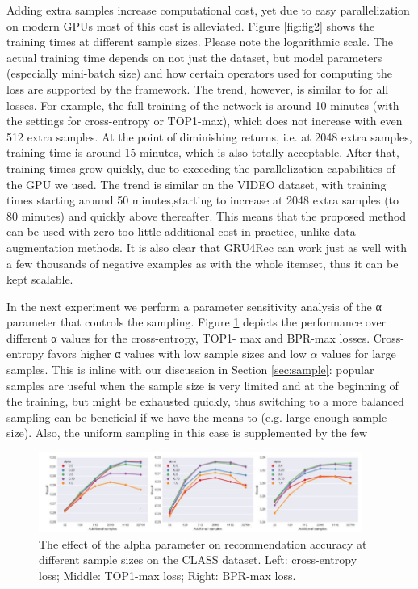 Adding extra samples increase computational cost, yet due to easy parallelization on modern GPUs most of this cost is alleviated. Figure \ref{fig:fig2} shows the training times at different sample sizes. Please note the logarithmic scale. The actual training time depends on not just the dataset, but model parameters (especially mini-batch size) and how certain operators used for computing the loss are supported by the framework. The trend, however, is similar to for all losses. For example, the full training of the network is around 10 minutes (with the settings for cross-entropy or TOP1-max), which does not increase with even 512 extra samples. At the point of diminishing returns, i.e. at 2048 extra samples, training time is around 15 minutes, which is also totally acceptable. After that, training times grow quickly, due to exceeding the parallelization capabilities of the GPU we used. The trend is similar on the VIDEO dataset, with training times starting around 50 minutes,starting to increase at 2048 extra samples (to 80 minutes) and quickly above thereafter. This means that the proposed method can be used with zero too little additional cost in practice, unlike data augmentation methods. It is also clear that GRU4Rec can work just as well with a few thousands of negative examples as with the whole itemset, thus it can be kept scalable.

In the next experiment we perform a parameter sensitivity analysis of the α parameter that controls the sampling. Figure \ref{fig:fig4} depicts the performance over different α values for the cross-entropy, TOP1- max and BPR-max losses. Cross-entropy favors higher α values with low sample sizes and low $\alpha$
values for large samples. This is inline with our discussion in Section \ref{sec:sample}: popular samples are useful
when the sample size is very limited and at the beginning of the training, but might be exhausted
quickly, thus switching to a more balanced sampling can be beneficial if we have the means to (e.g.
large enough sample size). Also, the uniform sampling in this case is supplemented by the few


\begin{figure}[htp]
    \centering
    \includegraphics[width=400]{img/p4.JPG}
    \caption{The effect of the alpha parameter on recommendation accuracy at different sample sizes
on the CLASS dataset. Left: cross-entropy loss; Middle: TOP1-max loss; Right: BPR-max loss.}
    \label{fig:fig4}
\end{figure}

